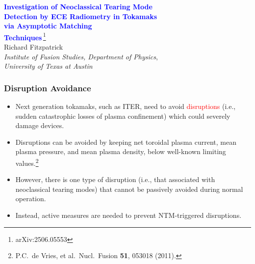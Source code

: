 \documentclass{beamer}
\newcommand{\blue}[1]{\textcolor{blue}{#1}}
\begin{document}
\begin{frame}
\begin{center}
\blue{\Large\bf Investigation of Neoclassical Tearing Mode}\\[1ex]
 \blue{\Large\bf Detection by ECE Radiometry in Tokamaks}\\[1ex]
 \blue{\Large\bf via Asymptotic Matching}\\[1ex]
 \blue{\Large\bf Techniques}\,\footnote{arXiv:2506.05553}\\[4ex]
Richard Fitzpatrick\\[2ex]
{\em Institute of Fusion Studies, Department of Physics},\\[0.5ex] {\em University of Texas at Austin}
\vspace{4cm}
\end{center}
\end{frame}

\begin{frame}
\frametitle{Disruption Avoidance}
 
\begin{itemize}
\item Next generation tokamaks, such as ITER, need to avoid \textcolor{red}{disruptions} (i.e., sudden catastrophic losses of plasma confinement) which could severely damage devices. 

\item Disruptions can be avoided by keeping net toroidal plasma current, mean plasma pressure, and mean plasma density, below well-known
limiting values.\footnote{P.C.~de Vries, et al.\ Nucl.\ Fusion {\bf 51}, 053018 (2011).}

\item However, there is one type of disruption (i.e., that associated with neoclassical tearing modes) that cannot be passively avoided during normal operation. 

\item  Instead, active measures are needed to prevent NTM-triggered disruptions. 

\end{itemize}
\end{frame}
\end{document}
